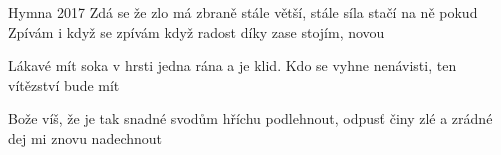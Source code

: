 \begin{TEXT}{Hymna 2017}
\SLOKA Zdá se  že zlo má zbraně \NL
stále větší, stále  \NL
síla  stačí na ně \NL
pokud  
\REFREN  Zpívám  i když  se \NL
         zpívám  když radost \NL
         díky  zase stojím, \NL
         novou  

\SLOKA Lákavé mít soka v hrsti \NL
jedna rána a je klid.\NL
Kdo se vyhne nenávisti, \NL
ten vítězství bude mít

\SLOKA Bože víš, že je tak snadné\NL
svodům hříchu podlehnout,\NL
odpusť činy zlé a zrádné \NL
dej mi znovu nadechnout
\end{TEXT}
